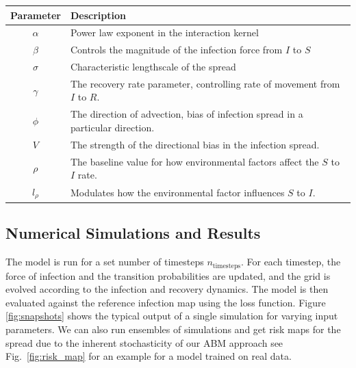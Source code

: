 \documentclass[12pt]{article}
\begin{document}
\begin{table}[h!]
\centering
\begin{tabular}{|c|l|}
\hline
\textbf{Parameter} & \textbf{Description} \\ \hline
$\alpha$ & Power law exponent in the interaction kernel \\ \hline
$\beta$ & Controls the magnitude of the infection force from $I$ to $S$ \\ \hline
$\sigma$ & Characteristic lengthscale of the spread \\ \hline
$\gamma$ & The recovery rate parameter, controlling rate of movement from $I$ to $R$. \\ \hline
$\phi$ & The direction of advection, bias of infection spread in a particular direction. \\ \hline
$V$ & The  strength of the directional bias in the infection spread. \\ \hline
$\rho$ & The baseline value for how environmental factors affect the $S$ to $I$ rate. \\ \hline
$l_{\rho}$ & Modulates how the environmental factor influences $S$ to $I$. \\ \hline
\end{tabular}
\end{table}

\subsection{Numerical Simulations and Results}
The model is run for a set number of timesteps $n_{\text{timesteps}}$. For each timestep, the force of infection and the transition probabilities are updated, and the grid is evolved according to the infection and recovery dynamics. The model is then evaluated against the reference infection map using the loss function. Figure \ref{fig:snapshots} shows the typical output of a single simulation for varying input parameters. We can also run ensembles of simulations and get risk maps for the spread due to the inherent stochasticity of our ABM approach see Fig.~\ref{fig:risk_map} for an example for a model trained on real data.
\end{document}
